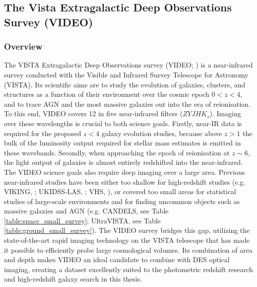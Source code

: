 \subsection{The Vista Extragalactic Deep Observations Survey (VIDEO)}\label{section:video}
\subsubsection{Overview}\label{subsubsection:video_overview}
The VISTA Extragalactic Deep Observations  survey (VIDEO; \citealt{2013MNRAS.428.1281J}) is a near-infrared survey conducted with the Visible and Infrared Survey Telescope for Astronomy (VISTA). Its scientific aims are to study the evolution of galaxies, clusters, and structures as a function of their environment over the cosmic epoch $0<z<4$, and to trace AGN and the most massive galaxies out into the era of reionisation. To this end, VIDEO covers \SI{12}{\sqdeg} in five near-infrared filters ($ZYJHK_{s}$). Imaging over these wavelengths is crucial to both science goals. Firstly, near-IR data is required for the proposed $z<4$ galaxy evolution studies, because above $z>1$ the bulk of the luminosity output required for stellar mass estimates is emitted in these wavebands. Secondly, when approaching the epoch of reionisation at $z\sim6$, the light output of galaxies is almost entirely redshifted into the near-infrared. The VIDEO science goals also require deep imaging over a large area. Previous near-infrared studies have been either too shallow for high-redshift studies (e.g. VIKING, \citealt{2013Msngr.154...32E}; UKIDSS-LAS, \citealt{2007MNRAS.379.1599L}; VHS, \citealt{2013Msngr.154...35M}), or covered too small areas for statistical studies of large-scale environments and for finding uncommon objects such as massive galaxies and AGN (e.g. CANDELS, see Table \ref{table:space_small_survey}; UltraVISTA, see Table \ref{table:ground_small_survey}).  The VIDEO survey bridges this gap, utilizing the state-of-the-art rapid imaging technology on the VISTA telescope that has made it possible to efficiently probe large cosmological volumes. Its combination of area and depth makes VIDEO an ideal candidate to combine with DES optical imaging, creating a dataset excellently suited to the photometric redshift research and high-redshift galaxy search in this thesis. \par

